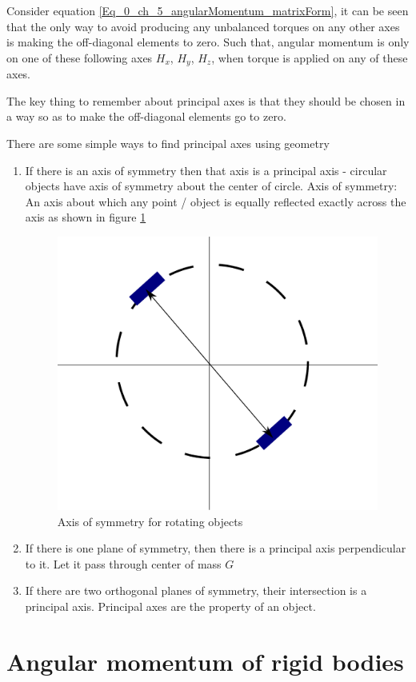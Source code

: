 Consider equation \ref{Eq_0_ch_5_angularMomentum_matrixForm}, it can be seen that the only way to avoid producing any unbalanced torques on any other axes is making the off-diagonal elements to zero. Such that, angular momentum is only on one of these following axes $H_{x}$, $H_{y}$, $H_{z}$, when torque is applied on any of these axes. 

The key thing to remember about principal axes is that they should be chosen in a way so as to make the off-diagonal elements go to zero.

There are some simple ways to find principal axes using geometry
\begin{enumerate}
	\item If there is an axis of symmetry then that axis is a principal axis - circular objects have axis of symmetry about the center of circle. Axis of symmetry: An axis about which any point / object is equally reflected exactly across the axis as shown in figure \ref{Fig_0_ch_5_MMI3}
	\begin{figure}[h!]
		\centering
		\includegraphics[width=0.4\linewidth]{Bilder/22_MMI3.pdf}
		\caption{Axis of symmetry for rotating objects}
		\label{Fig_0_ch_5_MMI3}
	\end{figure}

	\item If there is one plane of symmetry, then there is a principal axis perpendicular to it. Let it pass through center of mass $G$
	
	\item If there are two orthogonal planes of symmetry, their intersection is a principal axis. Principal axes are the property of an object.
\end{enumerate}

\section{Angular momentum of rigid bodies}

